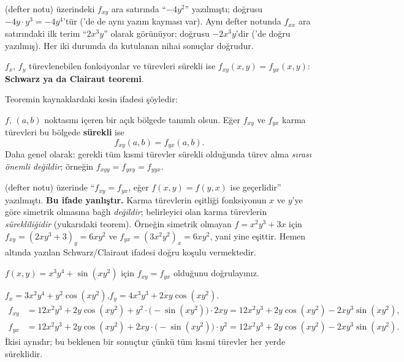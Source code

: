 \begin{bilgi}
 (defter notu) üzerindeki $f_{xy}$ ara satırında ``$-4y^2$'' yazılmıştı; doğrusu
$-4y\cdot y^3=-4y^4$'tür ('de de aynı yazım kayması var). Aynı defter notunda $f_{xx}$ ara
satırındaki ilk terim ``$2x^3y$'' olarak görünüyor; doğrusu $-2x^3y$'dir ('de doğru yazılmış).
Her iki durumda da kutulanan nihai sonuçlar doğrudur.
\end{bilgi}

\begin{tahta}
$f_x$, $f_y$ türevlenebilen fonksiyonlar ve türevleri sürekli ise $f_{xy}(x,y)=f_{yx}(x,y)$:
\textbf{Schwarz ya da Clairaut teoremi}.
\end{tahta}

Teoremin kaynaklardaki kesin ifadesi şöyledir:

\begin{teorem}
$f$, $(a,b)$ noktasını içeren bir açık bölgede tanımlı olsun. Eğer $f_{xy}$ ve $f_{yx}$ karma türevleri bu bölgede
\textbf{sürekli} ise
\[ f_{xy}(a,b)=f_{yx}(a,b). \]
Daha genel olarak: gerekli tüm kısmi türevler sürekli olduğunda türev alma \emph{sırası önemli değildir}; örneğin
$f_{xyy}=f_{yxy}=f_{yyx}$.
\end{teorem}

\begin{dikkat}
 (defter notu) üzerinde ``$f_{xy}=f_{yx}$, eğer $f(x,y)=f(y,x)$ ise geçerlidir'' yazılmıştı.
\textbf{Bu ifade yanlıştır.} Karma türevlerin eşitliği fonksiyonun $x$ ve $y$'ye göre simetrik olmasına bağlı
\emph{değildir}; belirleyici olan karma türevlerin \emph{sürekliliğidir} (yukarıdaki teorem). Örneğin simetrik olmayan
$f=x^2y^3+3x$ için $f_{xy}=(2xy^3+3)_y=6xy^2$ ve $f_{yx}=(3x^2y^2)_x=6xy^2$, yani yine eşittir. Hemen altında yazılan
Schwarz/Clairaut ifadesi doğru koşulu vermektedir.
\end{dikkat}

\begin{soru}
$f(x,y)=x^3y^4+\sin(xy^2)$ için $f_{xy}=f_{yx}$ olduğunu doğrulayınız.
\end{soru}
\begin{cevap}
$f_x=3x^2y^4+y^2\cos(xy^2)$,\quad $f_y=4x^3y^3+2xy\cos(xy^2)$.
\begin{align*}
f_{xy}&=12x^2y^3+2y\cos(xy^2)+y^2\cdot\big(-\sin(xy^2)\big)\cdot2xy=12x^2y^3+2y\cos(xy^2)-2xy^3\sin(xy^2),\\
f_{yx}&=12x^2y^3+2y\cos(xy^2)+2xy\cdot\big(-\sin(xy^2)\big)\cdot y^2=12x^2y^3+2y\cos(xy^2)-2xy^3\sin(xy^2).
\end{align*}
İkisi aynıdır; bu beklenen bir sonuçtur çünkü tüm kısmi türevler her yerde süreklidir.
\end{cevap}

